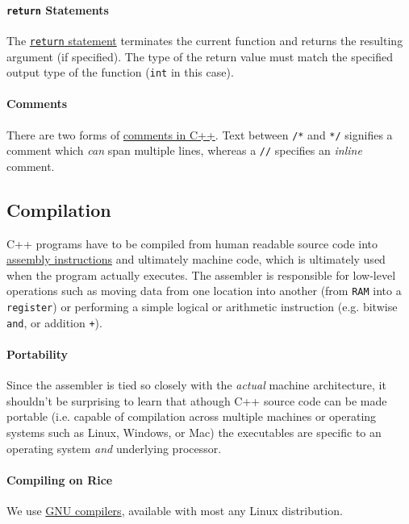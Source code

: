\documentclass[12pt,letterpaper,twoside]{article}
\begin{document}
\paragraph{\texttt{return} Statements}
The
\href{https://en.cppreference.com/w/cpp/language/return}{\texttt{return}
  statement} terminates the current function and returns the resulting
argument (if specified). The
  type of the return value must match the specified output type of the
  function (\texttt{int} in this case).

\paragraph{Comments}
There are two forms of \href{https://en.cppreference.com/w/cpp/comment}{comments in C++}.
Text between \texttt{/*} and \texttt{*/} signifies a comment
which \emph{can} span multiple lines, whereas a \texttt{//}
specifies an \emph{inline} comment.

\subsection{Compilation}
C++ programs have to be compiled from human readable source code into
\href{https://en.wikipedia.org/wiki/Assembly_language}{assembly instructions} and
ultimately machine code, which is ultimately used when the program
actually executes. The assembler is responsible for low-level
operations such as moving data from one location into another (from
\texttt{RAM} into a \texttt{register}) or performing a simple
logical or arithmetic instruction (e.g. bitwise \texttt{and}, or
addition \texttt{+}).

\paragraph{Portability}
Since the
assembler is tied so closely with the \emph{actual} machine architecture, it
shouldn't be surprising to learn that 
athough C++ source code can be made portable (i.e. capable of
compilation across multiple
machines or operating systems such as Linux, Windows, or Mac) the executables are specific to an
operating system \emph{and} underlying processor.

\paragraph{Compiling on Rice}
We use
\href{https://en.wikipedia.org/wiki/GNU_Compiler_Collection}{GNU compilers}, available with most any Linux
distribution.
\end{document}
